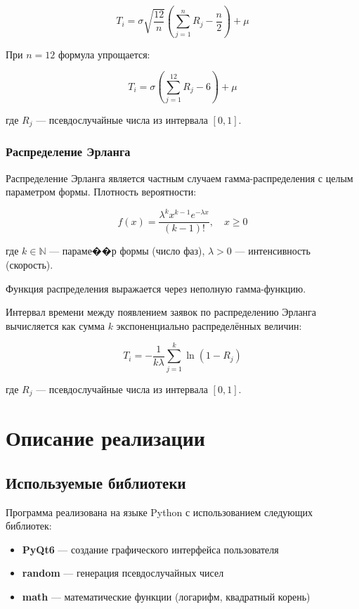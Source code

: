 \begin{equation}
T_i = \sigma\sqrt{\frac{12}{n}}\left(\sum_{j=1}^{n}R_j - \frac{n}{2}\right) + \mu
\end{equation}

При $n=12$ формула упрощается:

\begin{equation}
T_i = \sigma\left(\sum_{j=1}^{12}R_j - 6\right) + \mu
\end{equation}

где $R_j$ — псевдослучайные числа из интервала $[0, 1]$.

\subsubsection{Распределение Эрланга}

Распределение Эрланга является частным случаем гамма-распределения с целым параметром формы. Плотность вероятности:

\begin{equation}
f(x) = \frac{\lambda^k x^{k-1} e^{-\lambda x}}{(k-1)!}, \quad x \geq 0
\end{equation}

где $k \in \mathbb{N}$ — параме��р формы (число фаз), $\lambda > 0$ — интенсивность (скорость).

Функция распределения выражается через неполную гамма-функцию.

Интервал времени между появлением заявок по распределению Эрланга вычисляется как сумма $k$ экспоненциально распределённых величин:

\begin{equation}
T_i = -\frac{1}{k\lambda}\sum_{j=1}^{k}\ln(1 - R_j)
\end{equation}

где $R_j$ — псевдослучайные числа из интервала $[0, 1]$.

\section{Описание реализации}

\subsection{Используемые библиотеки}

Программа реализована на языке Python с использованием следующих библиотек:

\begin{itemize}
    \item \textbf{PyQt6} — создание графического интерфейса пользователя
    \item \textbf{random} — генерация псевдослучайных чисел
    \item \textbf{math} — математические функции (логарифм, квадратный корень)
\end{itemize}

